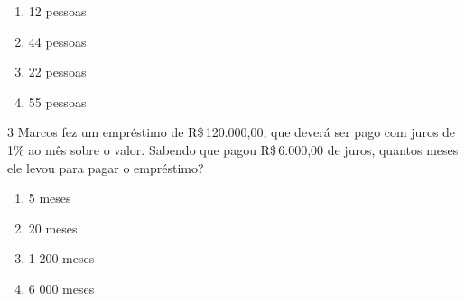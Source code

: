 \begin{enumerate}
\item 12 pessoas
\item 44 pessoas
\item 22 pessoas
\item 55 pessoas
\end{enumerate}











\num{3} Marcos fez um empréstimo de R\$\,120.000,00, que deverá ser pago com
juros de 1\% ao mês sobre o valor. Sabendo que pagou R\$\,6.000,00 de
juros, quantos meses ele levou para pagar o empréstimo?

\begin{enumerate}
\item 5 meses
\item 20 meses
\item 1 200 meses
\item 6 000 meses
\end{enumerate}



